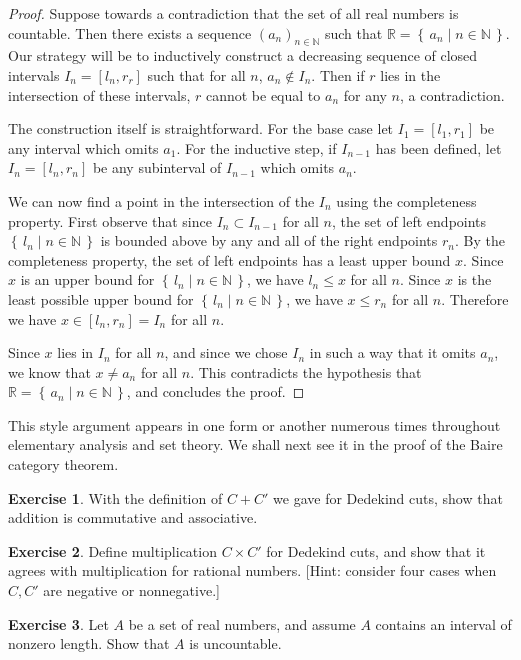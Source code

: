 \documentclass[11pt,oneside]{amsbook}
\newcommand{\set}[1]{\left\{\,#1\,\right\}}
\newcommand{\N}{\mathbb N}
\newcommand{\R}{\mathbb R}
\theoremstyle{definition}
\newtheorem{exerc}{Exercise}[section]
\theoremstyle{plain}
\theoremstyle{definition}
\theoremstyle{remark}
\numberwithin{equation}{section}
\numberwithin{figure}{section}
\begin{document}
\begin{proof}
  Suppose towards a contradiction that the set of all real numbers is countable. Then there exists a sequence $(a_n)_{n\in\N}$ such that $\R=\set{a_n\mid n\in\N}$. Our strategy will be to inductively construct a decreasing sequence of closed intervals $I_n=[l_n,r_r]$ such that for all $n$, $a_n\notin I_n$. Then if $r$ lies in the intersection of these intervals, $r$ cannot be equal to $a_n$ for any $n$, a contradiction.

The construction itself is straightforward. For the base case let $I_1=[l_1,r_1]$ be any interval which omits $a_1$. For the inductive step, if $I_{n-1}$ has been defined, let $I_n=[l_n,r_n]$ be any subinterval of $I_{n-1}$ which omits $a_n$.

We can now find a point in the intersection of the $I_n$ using the completeness property. First observe that since $I_n\subset I_{n-1}$ for all $n$, the set of left endpoints $\set{l_n\mid n\in\N}$ is bounded above by any and all of the right endpoints $r_n$. By the completeness property, the set of left endpoints has a least upper bound $x$. Since $x$ is an upper bound for $\set{l_n\mid n\in\N}$, we have $l_n\leq x$ for all $n$. Since $x$ is the least possible upper bound for $\set{l_n\mid n\in\N}$, we have $x\leq r_n$ for all $n$. Therefore we have $x\in[l_n,r_n]=I_n$ for all $n$.

Since $x$ lies in $I_n$ for all $n$, and since we chose $I_n$ in such a way that it omits $a_n$, we know that $x\neq a_n$ for all $n$. This contradicts the hypothesis that $\R=\set{a_n\mid n\in\N}$, and concludes the proof.
\end{proof}

This style argument appears in one form or another numerous times throughout elementary analysis and set theory. We shall next see it in the proof of the Baire category theorem.

\begin{exerc}
  With the definition of $C+C'$ we gave for Dedekind cuts, show that addition is commutative and associative.
\end{exerc}

\begin{exerc}
  Define multiplication $C\times C'$ for Dedekind cuts, and show that it agrees with multiplication for rational numbers. [Hint: consider four cases when $C,C'$ are negative or nonnegative.]
\end{exerc}

\begin{exerc}
  Let $A$ be a set of real numbers, and assume $A$ contains an interval of nonzero length. Show that $A$ is uncountable.
\end{exerc}
\end{document}
